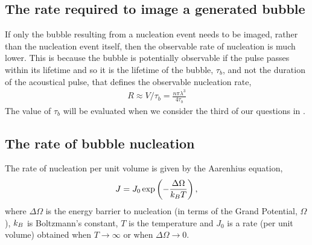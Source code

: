 \subsection{The rate required to image a generated bubble}

If only the bubble resulting from a nucleation event needs to be imaged, rather than the nucleation event itself, 
then the observable rate of nucleation is much lower.
This is because the bubble is potentially observable if the pulse passes within its lifetime 
and so it is the lifetime of the bubble, $\tau_b$, and not the duration of the acoustical pulse,
that defines the observable nucleation rate,
\begin{align}
R\approx V/\tau_b = \frac{n\pi\lambda^3}{4\tau_b}
\label{eqn:observable_rate_lifetime}
\end{align}
The value of $\tau_b$ will be evaluated when we consider the third of our questions in  .



\subsection{The rate of bubble nucleation}


The rate of nucleation per unit volume is given by the Aarenhius equation, 
\begin{align}
J = J_0\exp \lr{-\frac{\Delta \Omega}{\kB T}},%
\label{eqn:nuc:J}
\end{align}
where $\Delta \Omega$ is the energy barrier to nucleation (in terms of the Grand Potential, $\Omega$),
$k_B$ is Boltzmann's constant, $T$ is the temperature
and $J_0$ is a rate  (per unit volume) obtained when $T\rightarrow \infty$ or when $\Delta \Omega \rightarrow 0$.


